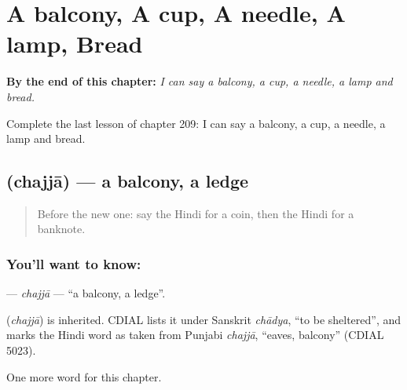 
\chapter{A balcony, A cup, A needle, A lamp, Bread}
\label{ch:hi-a-balcony-a-cup-a-needle-a-lamp-bread}

\begin{chapteropening}
\textbf{By the end of this chapter:} \emph{I can say a balcony, a cup, a needle, a lamp and bread.}

Complete the last lesson of chapter 209: I can say a balcony, a cup, a needle, a lamp and bread.
\end{chapteropening}

\section[\texorpdfstring{\hi{छज्जा} (chajjā)}{छज्जा (chajjā)}]{ (chajjā) — a balcony, a ledge}

\label{lesson:HI-C209-chajja}



\begin{quote}
Before the new one: say the Hindi for a coin, then the Hindi for a banknote.
\end{quote}

\subsection*{You'll want to know: }
\textbf{} — \emph{chajjā} — \textquotedblleft{}a balcony, a ledge\textquotedblright{}.

\begin{cousinweb}
\textbf{} (\emph{chajjā}) is inherited. CDIAL lists it under Sanskrit \emph{chādya}, \textquotedblleft{}to be sheltered\textquotedblright{}, and marks the Hindi word as taken from Punjabi \emph{chajjā}, \textquotedblleft{}eaves, balcony\textquotedblright{} (CDIAL 5023).
\end{cousinweb}

\begin{grammarlens}[title={What you've built}]
One more word for this chapter.
\end{grammarlens}

